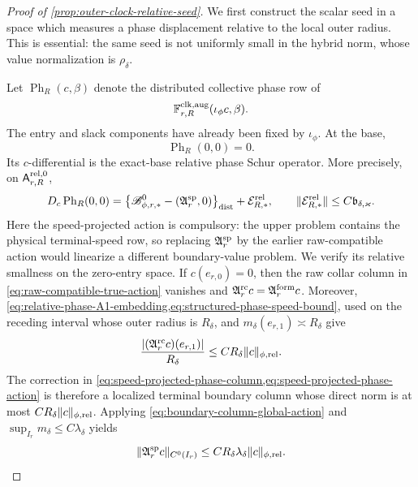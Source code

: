 \begin{proof}[Proof of \cref{prop:outer-clock-relative-seed}]
We first construct the scalar seed in a space which measures a phase
displacement relative to the local outer radius.  This is essential:
the same seed is not uniformly small in the hybrid norm, whose value
normalization is \(\rho_\delta\).

Let \(\operatorname{Ph}_R(c,\beta)\) denote the distributed collective
phase row of
\[
 \mathbb F_{r,R}^{\rm clk,aug}(\iota_\phi c,\beta).
\]
The entry and slack components have already been fixed by
\(\iota_\phi\).  At the base,
\[
 \operatorname{Ph}_R(0,0)=0.
\]
Its \(c\)-differential is the exact-base relative phase Schur operator.
More precisely, on
\(\mathsf A_{r,R}^{\rm rel,0}\),
\begin{equation}
 D_c\operatorname{Ph}_R(0,0)
 =\left\{\mathscr B_{\phi,r,*}^0
       -(\mathfrak A_r^{\rm sp},0)\right\}_{\rm dist}
       +\mathcal E_{R,*}^{\rm rel},\qquad
 \|\mathcal E_{R,*}^{\rm rel}\|\le C\mathfrak b_{\delta,\varkappa}.
                                                        \label{eq:proof-outer-clock-relative-schur}
\end{equation}
Here the speed-projected action is compulsory: the upper problem contains
the physical terminal-speed row, so replacing
\(\mathfrak A_r^{\rm sp}\) by the earlier raw-compatible action would
linearize a different boundary-value problem.  We verify its relative
smallness on the zero-entry space.  If
\(c(e_{r,0})=0\), then the raw collar column in
\cref{eq:raw-compatible-true-action} vanishes and
\(\mathfrak A_r^{\rm rc}c=\mathfrak A_r^{\rm form}c\).  Moreover,
\cref{eq:relative-phase-A1-embedding,eq:structured-phase-speed-bound},
used on the receding interval whose outer radius is \(R_\delta\), and
\(m_\delta(e_{r,1})\asymp R_\delta\) give
\begin{equation}
 \frac{|(\mathfrak A_r^{\rm rc}c)(e_{r,1})|}{R_\delta}
 \le CR_\delta\|c\|_{\phi,\rm rel}.             \label{eq:proof-outer-clock-speed-projection-datum}
\end{equation}
The correction in
\cref{eq:speed-projected-phase-column,eq:speed-projected-phase-action}
is therefore a localized terminal boundary column whose direct norm is
at most \(CR_\delta\|c\|_{\phi,\rm rel}\).  Applying
\cref{eq:boundary-column-global-action} and
\(\sup_{I_r}m_\delta\le C\lambda_\delta\) yields
\begin{equation}
 \|\mathfrak A_r^{\rm sp}c\|_{C^0(I_r)}
 \le CR_\delta\lambda_\delta
       \|c\|_{\phi,\rm rel}.                    \label{eq:proof-outer-clock-speed-projected-relative-smallness}

\end{equation}
\end{proof}
